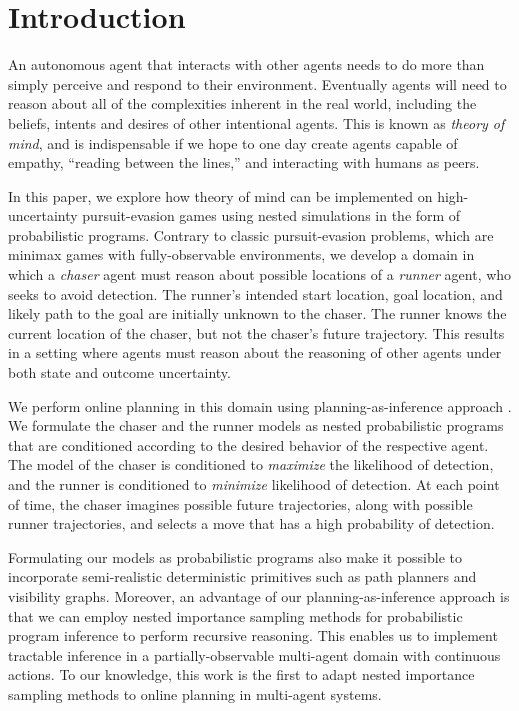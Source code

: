 \documentclass{article}
\begin{document}
\vspace{-2.0em}
\section{Introduction}

An autonomous agent that interacts with other agents needs to do more than simply perceive and respond to their environment. 
Eventually agents will need to reason about all of
the complexities inherent in the real world, including 
the beliefs, intents and desires of other intentional agents.  This is
known as \textit{theory of mind}, and is indispensable if we hope to
one day create agents capable of empathy, ``reading between the
lines,'' and interacting with humans as peers.

In this paper, we explore how theory of mind can be implemented on high-uncertainty pursuit-evasion games using nested simulations in the form of probabilistic programs. Contrary to classic pursuit-evasion problems, which are minimax games with fully-observable environments, we develop a domain in which a \emph{chaser} agent must reason about possible locations of a \emph{runner} agent, who seeks to avoid detection. The runner's intended start location, goal location, and likely path to the goal are initially unknown to the chaser. The runner knows the current location of the chaser, but not the chaser's future trajectory. This results in a setting where agents must reason about the reasoning of other agents under both state and outcome uncertainty.

We perform online planning in this domain using planning-as-inference approach \cite{toussaint06}. We formulate the chaser and the runner models as nested probabilistic programs that are conditioned according to the desired behavior of the respective agent. The model of the chaser is conditioned to \emph{maximize} the likelihood of detection, and the runner is conditioned to \emph{minimize} likelihood of detection. At each point of time, the chaser imagines possible future trajectories, along with possible runner trajectories, and selects a move that has a high probability of detection. 

Formulating our models as probabilistic programs also make it possible to incorporate semi-realistic deterministic primitives such as path planners and visibility graphs. 
Moreover, an advantage of our planning-as-inference approach is that we can employ nested importance sampling methods \cite{naesseth2015nested} for probabilistic program inference to perform recursive reasoning. This enables us to implement tractable inference in a partially-observable multi-agent domain with continuous actions. To our knowledge, this work is the first to adapt nested importance sampling methods to online planning in multi-agent systems.
\end{document}
